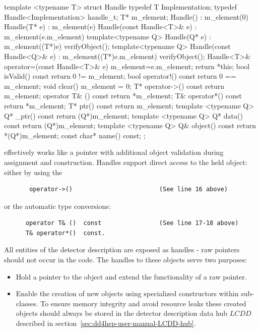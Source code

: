 \documentclass[10pt,a4paper]{article}
\begin{document}
\begin{code}
template <typename T> struct Handle  {
  typedef T Implementation;
  typedef Handle<Implementation> handle_t;
  T* m_element;
  Handle() : m_element(0)                  {                                     }
  Handle(T* e) : m_element(e)              {                                     }
  Handle(const Handle<T>& e) : m_element(e.m_element) {                          }
  template<typename Q> Handle(Q* e)
  : m_element((T*)e)                       { verifyObject();                     }
  template<typename Q> Handle(const Handle<Q>& e) 
  : m_element((T*)e.m_element)             { verifyObject();                     }
  Handle<T>& operator=(const Handle<T>& e) { m_element=e.m_element; return *this;}
  bool isValid() const                     { return 0 != m_element;              }
  bool operator!() const                   { return 0 == m_element;              }
  void clear()                             { m_element = 0;                      }
  T* operator->() const                    { return  m_element;                  }
  operator T& ()  const                    { return *m_element;                  }
  T& operator*()  const                    { return *m_element;                  }
  T* ptr() const                           { return  m_element;                  }
  template <typename Q> Q* _ptr() const    { return  (Q*)m_element;              }
  template <typename Q> Q*  data() const   { return  (Q*)m_element;              }
  template <typename Q> Q&  object() const { return *(Q*)m_element;              }
  const char* name() const;
};
\end{code}

\noindent
effectively works like a pointer with additional object validation during assignment
and construction. Handles support direct access to the held object: either by using 
the 

\begin{verbatim}
       operator->()                        (See line 16 above)
\end{verbatim}

\noindent
or the automatic type conversions:

\begin{verbatim}
      operator T& ()  const                (See line 17-18 above)
      T& operator*()  const.
\end{verbatim}

\noindent
All entities of the \DDhep detector description are exposed as handles - 
raw pointers should not occur in the code. 
The handles to these objects serve two purposes:
\begin{itemize}\itemcompact
\item Hold a pointer to the object and extend the functionality of a raw
    pointer.
\item Enable the creation of new objects using specialized constructors
    within sub-classes. To ensure memory integrity and avoid resource 
    leaks these created objects should always be stored in the 
    detector description data hub $LCDD$ described in 
    section~\ref{sec:dd4hep-user-manual-LCDD-hub}.
\end{itemize}
\end{document}
